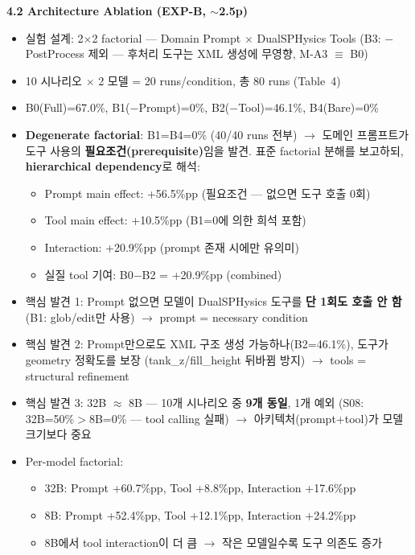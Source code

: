 \documentclass[11pt,a4paper]{article}
\begin{document}
\textbf{4.2 Architecture Ablation (EXP-B, {\small\color{gray}$\sim$2.5p})}
\begin{itemize}[nosep,leftmargin=1.5em]
\item 실험 설계: 2$\times$2 factorial --- Domain Prompt $\times$ DualSPHysics Tools
  (B3: $-$PostProcess 제외 --- 후처리 도구는 XML 생성에 무영향, M-A3 $\equiv$ B0)
\item 10 시나리오 $\times$ 2 모델 = 20 runs/condition, 총 80 runs (Table~4)
\item B0(Full)=67.0\%, B1($-$Prompt)=0\%, B2($-$Tool)=46.1\%, B4(Bare)=0\%
\item \textbf{Degenerate factorial}: B1=B4=0\% (40/40 runs 전부) $\rightarrow$ 도메인 프롬프트가 도구 사용의 \textbf{필요조건(prerequisite)}임을 발견. 표준 factorial 분해를 보고하되, \textbf{hierarchical dependency}로 해석:
  \begin{itemize}[nosep,leftmargin=1em]
  \item Prompt main effect: +56.5\%pp (필요조건 --- 없으면 도구 호출 0회)
  \item Tool main effect: +10.5\%pp (B1=0에 의한 희석 포함)
  \item Interaction: +20.9\%pp (prompt 존재 시에만 유의미)
  \item 실질 tool 기여: B0$-$B2 = +20.9\%pp (combined)
  \end{itemize}
\item 핵심 발견 1: Prompt 없으면 모델이 DualSPHysics 도구를 \textbf{단 1회도 호출 안 함} (B1: glob/edit만 사용) $\rightarrow$ prompt = necessary condition
\item 핵심 발견 2: Prompt만으로도 XML 구조 생성 가능하나(B2=46.1\%), 도구가 geometry 정확도를 보장 (tank\_z/fill\_height 뒤바뀜 방지) $\rightarrow$ tools = structural refinement
\item 핵심 발견 3: 32B $\approx$ 8B --- 10개 시나리오 중 \textbf{9개 동일}, 1개 예외 (S08: 32B=50\%$>$8B=0\% --- tool calling 실패) $\rightarrow$ 아키텍처(prompt+tool)가 모델 크기보다 중요
\item Per-model factorial:
  \begin{itemize}[nosep,leftmargin=1em]
  \item 32B: Prompt +60.7\%pp, Tool +8.8\%pp, Interaction +17.6\%pp
  \item 8B: Prompt +52.4\%pp, Tool +12.1\%pp, Interaction +24.2\%pp
  \item 8B에서 tool interaction이 더 큼 $\rightarrow$ 작은 모델일수록 도구 의존도 증가
  \end{itemize}
\end{itemize}
\end{document}
